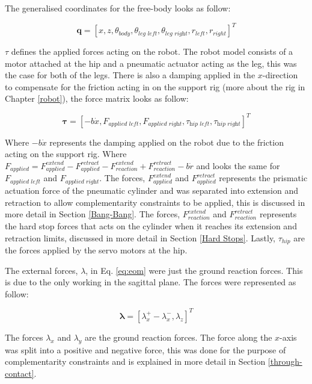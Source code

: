     The generalised coordinates for the free-body looks as follow:
    
    \begin{equation}
        \bm{q} = [x,z, \theta_{body},\theta_{\textit{leg left}}, \theta_{\textit{leg right}}, r_{left}, r_{right}]^T
    \end{equation}
    
    $\tau$ defines the applied forces acting on the robot. The robot model consists of a motor attached at the hip and a pneumatic actuator acting as the leg, this was the case for both of the legs. There is also a damping applied in the $x$-direction to compensate for the friction acting in on the support rig (more about the rig in Chapter \ref{robot}), the force matrix looks as follow:
    
    \begin{equation}
        \bm{\tau} = [-b\dot{x}, F_{\textit{applied left}}, F_{\textit{applied right}}, \tau_{\textit{hip left}}, \tau_{\textit{hip right}}]^T
    \end{equation}
    
    Where $-b\dot{x}$ represents the damping applied on the robot due to the friction acting on the support rig. Where $F_{applied} = F_{applied}^{extend} - F_{applied}^{retract} - F_{reaction}^{extend} + F_{reaction}^{retract} - b\dot{r}$ and looks the same for $F_{\textit{applied left}}$ and $F_{\textit{applied right}}$. The forces, $F_{applied}^{extend}$ and $F_{applied}^{retract}$ represents the prismatic actuation force of the pneumatic cylinder and was separated into extension and retraction to allow complementarity constraints to be applied, this is discussed in more detail in Section \ref{Bang-Bang}. The forces, $F_{reaction}^{extend}$ and $F_{reaction}^{retract}$ represents the hard stop forces that acts on the cylinder when it reaches its extension and retraction limits, discussed in more detail in Section \ref{Hard Stops}. Lastly, $\tau_{hip}$ are the forces applied by the servo motors at the hip.
    
    The external forces, $\lambda$, in Eq. \ref{eq:eom} were just the ground reaction forces. This is due to the only working in the sagittal plane. The forces were represented as follow:

    \begin{equation} \label{eq:GRF}
        \bm{\lambda} = [\lambda_x^+ - \lambda_x^-, \lambda_z]^T
    \end{equation}
    
    The forces $\lambda_x$ and $\lambda_y$ are the ground reaction forces. The force along the $x$-axis was split into a positive and negative force, this was done for the purpose of complementarity constraints and is explained in more detail in Section \ref{through-contact}.
    
